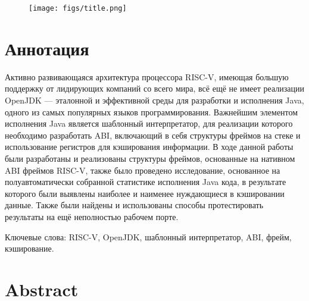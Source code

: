 \documentclass[14pt]{spbau-diploma}
\begin{document}
\let\NeedsTeXFormat\ignore
\let\newcommand\renewcommand
\makeatletter
%
\makeatother  
\let\newcommand\orignewcommand
\let\NeedsTeXFormat\origNeedsTeXFormat
{}

\thispagestyle{empty}
\begin{figure}[hbtp!]
    \centering
    \texttt{[image: figs/title.png]}
\end{figure}

\newpage

\setcounter{page}{1}

\tableofcontents



\section*{Аннотация}

Активно развивающаяся архитектура процессора RISC-V, имеющая большую поддержку от лидирующих компаний со всего мира, всё ещё не имеет реализации OpenJDK --- эталонной и эффективной среды для разработки и исполнения Java, одного из самых популярных языков программирования. Важнейшим элементом исполнения Java является шаблонный интерпретатор, для реализации которого необходимо разработать ABI, включающий в себя структуры фреймов на стеке и использование регистров для кэширования информации. В ходе данной работы были разработаны и реализованы структуры фреймов, основанные на нативном ABI фреймов RISC-V, также было проведено исследование, основанное на полуавтоматически собранной статистике исполнения Java кода, в результате которого были выявлены наиболее и наименее нуждающиеся в кэшировании данные. Также были найдены и использованы способы протестировать результаты на ещё неполностью рабочем порте.

\vspace*{1em}

Ключевые слова: RISC-V, OpenJDK, шаблонный интерпретатор, ABI, фрейм, кэширование.

\section*{Abstract}
\end{document}
